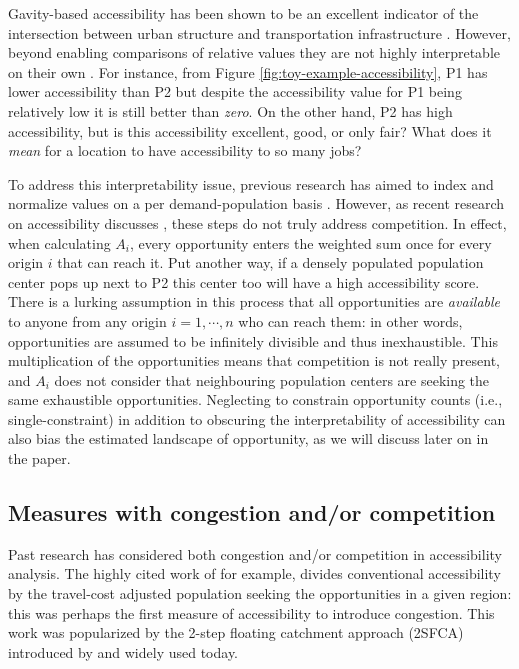 \documentclass[]{elsarticle} %
\begin{document}
Gavity-based accessibility has been shown to be an excellent indicator
of the intersection between urban structure and transportation
infrastructure
\citep{shi_literature_2020, reggiani_accessibility_2011, kwan_spacetime_1998}.
However, beyond enabling comparisons of relative values they are not
highly interpretable on their own \citep{miller2018}. For instance, from
Figure \ref{fig:toy-example-accessibility}, P1 has lower accessibility
than P2 but despite the accessibility value for P1 being relatively low
it is still better than \emph{zero}. On the other hand, P2 has high
accessibility, but is this accessibility excellent, good, or only fair?
What does it \emph{mean} for a location to have accessibility to so many
jobs?

To address this interpretability issue, previous research has aimed to
index and normalize values on a per demand-population basis
\citep[e.g.,][]{barboza_balancing_2021, pereira_distributional_2019, wang_access_2021}.
However, as recent research on accessibility discusses
\citep{merlin2017competition, allen2019, paez2019, kelobonye2020measuring},
these steps do not truly address competition. In effect, when
calculating \(A_i\), every opportunity enters the weighted sum once for
every origin \(i\) that can reach it. Put another way, if a densely
populated population center pops up next to P2 this center too will have
a high accessibility score. There is a lurking assumption in this
process that all opportunities are \emph{available} to anyone from any
origin \(i=1,\cdots,n\) who can reach them: in other words,
opportunities are assumed to be infinitely divisible and thus
inexhaustible. This multiplication of the opportunities means that
competition is not really present, and \(A_i\) does not consider that
neighbouring population centers are seeking the same exhaustible
opportunities. Neglecting to constrain opportunity counts (i.e.,
single-constraint) in addition to obscuring the interpretability of
accessibility can also bias the estimated landscape of opportunity, as
we will discuss later on in the paper.

\hypertarget{measures-with-congestion-andor-competition}{%
\subsection{Measures with congestion and/or
competition}\label{measures-with-congestion-andor-competition}}

Past research has considered both congestion and/or competition in
accessibility analysis. The highly cited work of \citeyearpar{shen1998}
for example, divides conventional accessibility by the travel-cost
adjusted population seeking the opportunities in a given region: this
was perhaps the first measure of accessibility to introduce congestion.
This work was popularized by the 2-step floating catchment approach
(2SFCA) introduced by \citeyearpar{luo2003} and widely used today.
\end{document}
